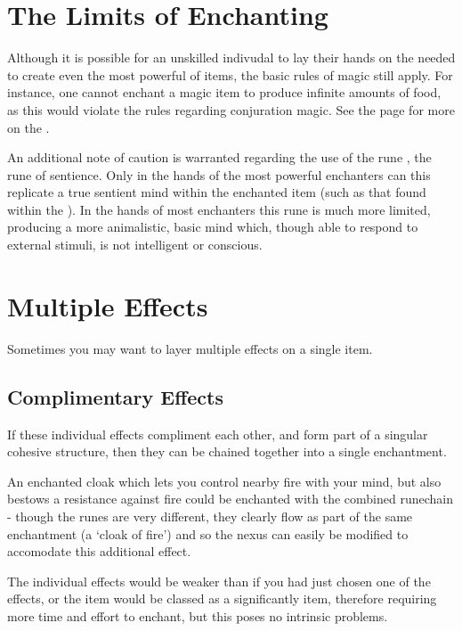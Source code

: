 \section{The Limits of Enchanting}

Although it is possible for an unskilled indivudal to lay their hands on the  needed to create even the most powerful of items, the basic rules of magic still apply. For instance, one cannot enchant a magic item to produce infinite amounts of food, as this would violate the rules regarding conjuration magic. See the page \pageref{S:Laws} for more on the .

An additional note of caution is warranted regarding the use of the rune \rune{\animax}, the rune of sentience. Only in the hands of the most powerful enchanters can this replicate a true sentient mind within the enchanted item (such as that found within the  ). In the hands of most enchanters this rune is much more limited, producing a more animalistic, basic mind which, though able to respond to external stimuli, is not intelligent or conscious.  


\section{Multiple Effects}

Sometimes you may want to layer multiple effects on a single item. 

\subsection{Complimentary Effects} 

If these individual effects compliment each other, and form part of a singular cohesive structure, then they can be chained together into a single enchantment. 

An enchanted cloak which lets you control nearby fire with your mind, but also bestows a resistance against fire could be enchanted with the combined runechain \rune{\mentis\velox\primum\iuxta\aeternum\clypus} - though the runes are very different, they clearly flow as part of the same enchantment (a `cloak of fire') and so the nexus can easily be modified to accomodate this additional effect. 

The individual effects would be weaker than if you had just chosen one of the effects, or the item would be classed as a significantly  item, therefore requiring more time and effort to enchant, but this poses no intrinsic problems. 

